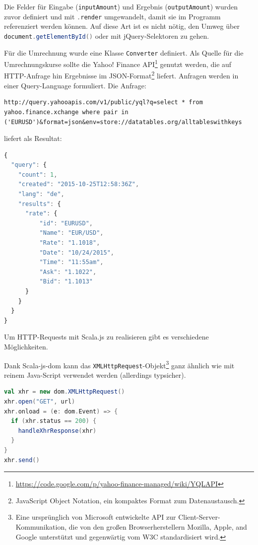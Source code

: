 \documentclass[a4paper, 12pt, hidelinks, listof=totoc, listoftables=totoc, bibliography=totoc]{scrreprt}
\newcommand{\code}[1]{\lstinline[language=Scala, style=inline]|#1|}
\newcommand{\scala}[1]{\lstinline[language=Scala, style=inline]|#1|}
\begin{document}
Die Felder für Eingabe (\scala{inputAmount}) und Ergebnis (\scala{outputAmount}) wurden zuvor definiert und mit \scala{.render} umgewandelt, damit sie im Programm referenziert werden können. Auf diese Art ist es nicht nötig, den Umweg über \scala{document.getElementById()} oder mit jQuery-Selektoren zu gehen.

Für die Umrechnung wurde eine Klasse \scala{Converter} definiert. Als Quelle für die Umrechnungskurse sollte die Yahoo! Finance API\footnote{\url{https://code.google.com/p/yahoo-finance-managed/wiki/YQLAPI}} genutzt werden, die auf HTTP-Anfrage hin Ergebnisse im JSON-Format\footnote{JavaScript Object Notation, ein kompaktes Format zum Datenaustausch.} liefert. Anfragen werden in einer Query-Language formuliert. Die Anfrage:

\begin{lstlisting}[aboveskip=0pt, style=snippet]
http://query.yahooapis.com/v1/public/yql?q=select * from yahoo.finance.xchange where pair in ('EURUSD')&format=json&env=store://datatables.org/alltableswithkeys
\end{lstlisting}

liefert als Resultat:

\begin{lstlisting}[language=JavaScript, style=snippet]
{
  "query": {
    "count": 1,
    "created": "2015-10-25T12:58:36Z",
    "lang": "de",
    "results": {
      "rate": {
          "id": "EURUSD",
          "Name": "EUR/USD",
          "Rate": "1.1018",
          "Date": "10/24/2015",
          "Time": "11:55am",
          "Ask": "1.1022",
          "Bid": "1.1013"
      }
    }
  }
}
\end{lstlisting}

Um HTTP-Requests mit Scala.js zu realisieren gibt es verschiedene Möglichkeiten\cite[\#UsingWebServices]{haoyi.HOS}.

Dank Scala-js-dom kann das \code{XMLHttpRequest}-Objekt\footnote{Eine ursprünglich von Microsoft entwickelte API zur Client-Server-Kommunikation, die von den großen Browserherstellern Mozilla, Apple, and Google unterstützt und gegenwärtig vom W3C standardisiert wird.\cite{mdn.XHR}} ganz ähnlich wie mit reinem Java-Script verwendet werden (allerdings typsicher).

\begin{lstlisting}[language=Scala, caption={HTTP-Aufruf mit XMLHttpRequest.}]
val xhr = new dom.XMLHttpRequest()
xhr.open("GET", url)
xhr.onload = (e: dom.Event) => {
  if (xhr.status == 200) {
    handleXhrResponse(xhr)
  }
}
xhr.send()
\end{lstlisting}
\end{document}
